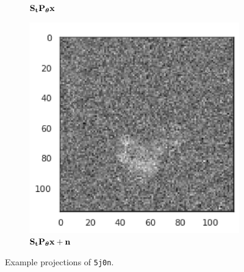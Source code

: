 \begin{figure}[ht!]
\begin{minipage}[b]{0.35\linewidth}
\begin{subfigure}[b]{0.49\linewidth}
            \caption*{$\mathbf{S}_{\mathbf{t}} \mathbf{P}_{{\boldsymbol{\theta}}} \mathbf{x}$}
        \end{subfigure}
        \hfill
        \begin{subfigure}[b]{0.49\linewidth}
            \centering
            \includegraphics[width=0.8\linewidth]{figures/5j0n_noise16_translated}
            \caption*{$\mathbf{S}_{\mathbf{t}} \mathbf{P}_{{\boldsymbol{\theta}}} \mathbf{x} + \mathbf{n}$}
        \end{subfigure}
        \caption{%
            Example projections of \texttt{5j0n}. 
        }\label{fig:different-projections}
    \end{minipage}
\end{figure}

